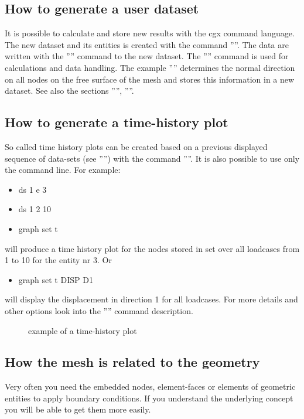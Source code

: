 \documentclass{article}
\begin{document}
\begin{appendix}
\subsection{\label{How to generate a user dataset}How to generate a user dataset}
It is possible to calculate and store new results with the cgx command language. The new dataset and its entities is created with the command ''''. The data are written with the '''' command to the new dataset. The '''' command is used for calculations and data handling. The example '''' determines the normal direction on all nodes on the free surface of the mesh and stores this information in a new dataset. See also the sections '''', ''''.

\subsection{\label{How to generate a time-history plot}How to generate a time-history plot}
So called time history plots can be created based on a previous displayed sequence of data-sets (see '''') with the command ''''. It is also possible to use only the command line. For example:
\begin{itemize}
\item ds 1 e 3
\item ds 1 2 10
\item graph set t
\end{itemize}
will produce a time history plot for the nodes stored in set over all loadcases from 1 to 10 for the entity nr 3.
Or
\begin{itemize}
\item graph set t DISP D1
\end{itemize}
will display the displacement in direction 1 for all loadcases.
For more details and other options look into the '''' command description.
\newpage

\begin{figure}[h]
\caption{\label{graph2D} example of a time-history plot }
\end{figure}


\subsection{\label{How the mesh is related to the geometry}How the mesh is related to the geometry}
Very often you need the embedded nodes, element-faces or elements of geometric entities to apply boundary conditions. If you understand the underlying concept you will be able to get them more easily.


\end{appendix}
\end{document}

